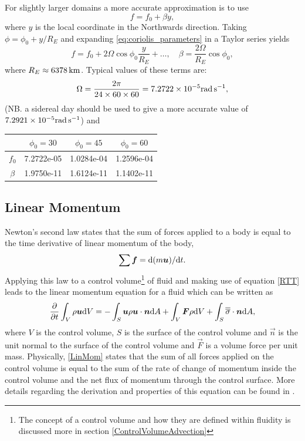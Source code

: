 For slightly larger domains a more accurate approximation is to use
\begin{equation}\label{eq:beta-plane}
f = f_0 + \beta y,
\end{equation}
where $y$ is the local coordinate in the Northwards direction.
Taking $\phi = \phi_0 + y/R_E$ and expanding \eqref{eq:coriolis_parameters} 
in a Taylor series yields
\begin{equation*}
f = f_0 +2\Omega\cos\phi_0\frac{y}{R_E}+\ldots,\quad \beta = \frac{2\Omega}{R_E}\cos\phi_0,
\end{equation*}
where $R_E\approx\unit[6378]{km}$. Typical values of these terms are: 
\begin{equation*}
\Omega = \frac{2\pi}{24\times 60\times 60} = 7.2722\times 10^{-5}\rads[],
\end{equation*}
(NB. a sidereal day should be used to give a more accurate value of $7.2921\times 10^{-5}\rads[]$)
and
\begin{center}\begin{small}
\begin{tabular}{c|ccc}
  &  $\phi_0 = 30$ & $\phi_0=45$ & $\phi_0 = 60$ \\  \hline
 $f_0$  & 7.2722e-05 & 1.0284e-04 & 1.2596e-04 \\
 $\beta$  & 1.9750e-11  &  1.6124e-11  &  1.1402e-11 \\
\end{tabular}\end{small}
\end{center}

\subsection{Linear Momentum}

Newton's second law states that the sum of forces applied to a body is equal to the time derivative of linear momentum of the body,
\begin{equation}\label{Newtons2nd}
 \sum {\mbox{\boldmath$f$}} = \mathrm{d}(m{\mbox{\boldmath$u$}})/\mathrm{d} t.
\end{equation}
Applying this law to a control volume\footnote{The concept of a control volume and how they are defined within fluidity is discussed more in section \ref{ControlVolumeAdvection}} of fluid and making use of equation \ref{RTT} leads to the linear momentum equation for a fluid which can be written as
\begin{equation}\label{LinMom}
 \frac{\partial}{\partial t}\int_{V}\rho{\mbox{\boldmath$u$}} \mathrm{d} V = -\int_{S} {\mbox{\boldmath$u$}} \rho {\mbox{\boldmath$u$}}\cdot{\mbox{\boldmath$n$}} \mathrm{d} A+\int_{V}{\mbox{\boldmath$F$}}\rho \mathrm{d} V
                                                      +\int_{S} \overline{\overline{\sigma}}\cdot{\mbox{\boldmath$n$}} \mathrm{d} A,
\end{equation}
where $V$ is the control volume, $S$ is the surface of the control volume and $\vec n$ is the unit normal to the surface of the control volume and $\vec F$ is a volume force per unit mass. Physically, \ref{LinMom} states that the sum of all forces applied on the control volume is equal to the sum of the rate of change of momentum inside the control volume and the net flux of momentum through the control surface. More details regarding the derivation and properties of this equation can be found in \citet{batchelor1967}.

